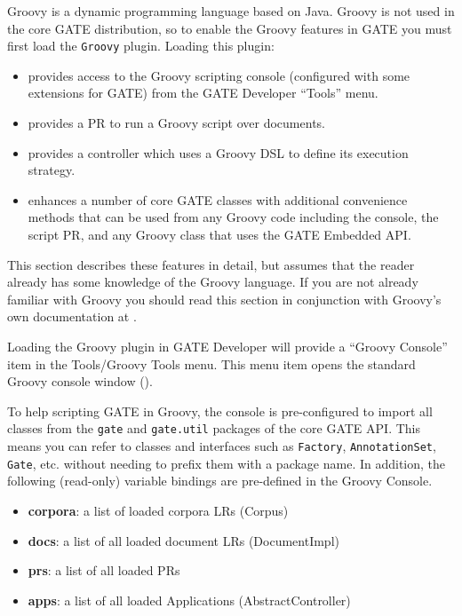 Groovy is a dynamic programming language based on Java. Groovy is not used in
the core GATE distribution, so to enable the Groovy features in GATE you must
first load the \verb|Groovy| plugin.  Loading this plugin:
\begin{itemize}
\item provides access to the Groovy scripting console (configured with some
  extensions for GATE) from the GATE Developer ``Tools'' menu.
\item provides a PR to run a Groovy script over documents.
\item provides a controller which uses a Groovy DSL to define its execution
  strategy.
\item enhances a number of core GATE classes with additional convenience
  methods that can be used from any Groovy code including the console, the
  script PR, and any Groovy class that uses the GATE Embedded API.
\end{itemize}
    
This section describes these features in detail, but assumes that the reader
already has some knowledge of the Groovy language.  If you are not already
familiar with Groovy you should read this section in conjunction with Groovy's
own documentation at .


Loading the Groovy plugin in GATE Developer will provide a ``Groovy Console''
item in the Tools/Groovy Tools menu.  This menu item opens the standard Groovy
console window ().

To help scripting GATE in Groovy, the console is pre-configured to import all
classes from the \verb|gate| and \verb|gate.util| packages of the core GATE
API.  This means you can refer to
classes and interfaces such as \verb|Factory|, \verb|AnnotationSet|,
\verb|Gate|, etc. without needing to prefix them with a package name.
In addition, the following (read-only) variable bindings are pre-defined in the
Groovy Console.

\begin{itemize}
\item \textbf{corpora}: a list of loaded corpora LRs (Corpus)
\item \textbf{docs}: a list of all loaded document LRs (DocumentImpl)
\item \textbf{prs}: a list of all loaded PRs
\item \textbf{apps}: a list of all loaded Applications (AbstractController)
\end{itemize}

